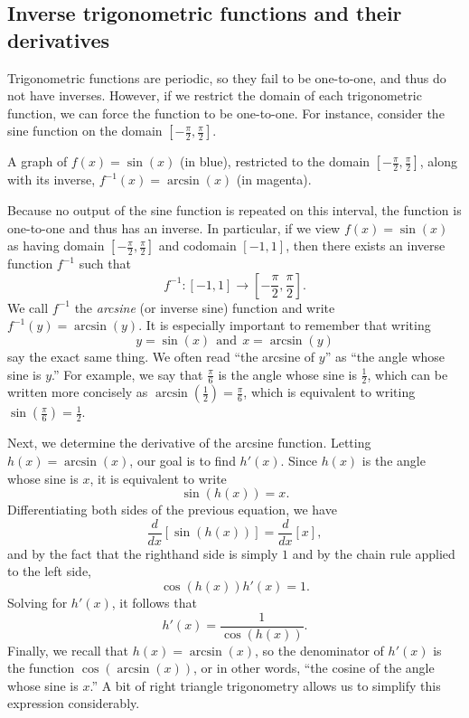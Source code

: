 \subsection*{Inverse trigonometric functions and their derivatives}

Trigonometric functions are periodic, so they fail to be one-to-one, and thus do not have inverses.  However, if we restrict the domain of each trigonometric function, we can force the function to be one-to-one.  For instance, consider the sine function on the domain $[-\frac{\pi}{2}, \frac{\pi}{2}]$.  

\begin{marginfigure}[3cm] %
\caption{A graph of $f(x) = \sin(x)$ (in blue), restricted to the domain $[-\frac{\pi}{2}, \frac{\pi}{2}]$, along with its inverse, $f^{-1}(x) = \arcsin(x)$ (in magenta).} \label{F:2.6.arcsine}
\end{marginfigure}

Because no output of the sine function is repeated on this interval, the function is one-to-one and thus has an inverse.  In particular, if we view $f(x) = \sin(x)$ as having domain $[-\frac{\pi}{2}, \frac{\pi}{2}]$ and codomain $[-1,1]$, then there exists an inverse function $f^{-1}$ such that
$$f^{-1} : [-1,1] \to \left[-\frac{\pi}{2}, \frac{\pi}{2}\right].$$
We call $f^{-1}$ the \emph{arcsine}  (or inverse sine) function and write $f^{-1}(y) = \arcsin(y).$  It is especially important to remember that writing
$$y = \sin(x) \ \ \mbox{and} \ \ x = \arcsin(y)$$
say the exact same thing.  We often read ``the arcsine of $y$'' as ``the angle whose sine is $y$.''  For example, we say that $\frac{\pi}{6}$ is the angle whose sine is $\frac{1}{2}$, which can be written more concisely as $\arcsin(\frac{1}{2}) = \frac{\pi}{6}$, which is equivalent to writing $\sin(\frac{\pi}{6}) = \frac{1}{2}.$

Next, we determine the derivative of the arcsine function.  Letting $h(x) = \arcsin(x)$, our goal is to find $h'(x)$.  Since $h(x)$ is the angle whose sine is $x$, it is equivalent to write
$$\sin(h(x)) = x.$$
Differentiating both sides of the previous equation, we have
$$\frac{d}{dx}[\sin(h(x))] = \frac{d}{dx}[x],$$
and by the fact that the righthand side is simply $1$ and by the chain rule applied to the left side,
$$\cos(h(x)) h'(x) = 1.$$
Solving for $h'(x)$, it follows that
$$h'(x) = \frac{1}{\cos(h(x))}.$$
Finally, we recall that $h(x) = \arcsin(x)$, so the denominator of $h'(x)$ is the function $\cos(\arcsin(x))$, or in other words, ``the cosine of the angle whose sine is $x$.''  A bit of right triangle trigonometry allows us to simplify this expression considerably.

